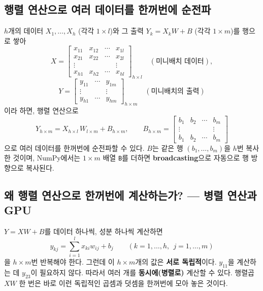 \documentclass[11pt,a4paper]{article}
\begin{document}
\subsection{행렬 연산으로 여러 데이터를 한꺼번에 순전파}

$h$개의 데이터 $X_1,\ldots,X_h$ (각각 $1\times l$)와 그 출력 $Y_k=X_kW+B$ (각각 $1\times m$)를
행으로 쌓아
\[
X=
\begin{bmatrix}
x_{11}&x_{12}&\cdots&x_{1l}\\
x_{21}&x_{22}&\cdots&x_{2l}\\
\vdots&&&\vdots\\
x_{h1}&x_{h2}&\cdots&x_{hl}
\end{bmatrix}_{h\times l}
\quad(\text{미니배치 데이터}),
\]
\[
Y=
\begin{bmatrix}
y_{11}&\cdots&y_{1m}\\
\vdots&&\vdots\\
y_{h1}&\cdots&y_{hm}
\end{bmatrix}_{h\times m}
\quad(\text{미니배치의 출력})
\]
이라 하면, 행렬 연산으로
\[
\boxed{
Y_{h\times m}=X_{h\times l}\,W_{l\times m}+B_{h\times m},
\qquad
B_{h\times m}=
\begin{bmatrix}
b_1&b_2&\cdots&b_m\\
\vdots&&&\vdots\\
b_1&b_2&\cdots&b_m
\end{bmatrix}
}
\]
으로 여러 데이터를 한꺼번에 순전파할 수 있다.
$B$는 같은 행 $(b_1,\ldots,b_m)$을 $h$번 복사한 것이며,
NumPy에서는 $1\times m$ 배열 \texttt{B}를 더하면 \textbf{broadcasting}으로 자동으로 행 방향으로 복사된다.

\subsection{왜 행렬 연산으로 한꺼번에 계산하는가? --- 병렬 연산과 GPU}

$Y=XW+B$를 데이터 하나씩, 성분 하나씩 계산하면
\[
y_{kj}=\sum_{i=1}^{l}x_{ki}w_{ij}+b_j
\qquad(k=1,\ldots,h,\ \ j=1,\ldots,m)
\]
을 $h\times m$번 반복해야 한다.
그런데 이 $h\times m$개의 값은 \textbf{서로 독립적}이다. $y_{11}$을 계산하는 데 $y_{23}$이 필요하지 않다.
따라서 여러 개를 \textbf{동시에(병렬로)} 계산할 수 있다.
행렬곱 $XW$ 한 번은 바로 이런 독립적인 곱셈과 덧셈을 한꺼번에 모아 놓은 것이다.
\end{document}
